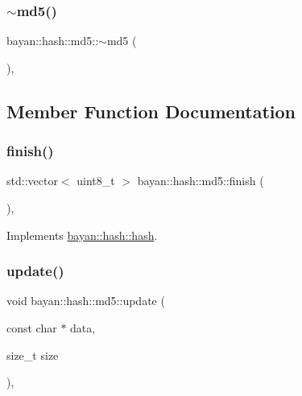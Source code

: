 \mbox{\label{classbayan_1_1hash_1_1md5_a76f7a0803576bd2746bca20a985407c4}} 
\subsubsection{\texorpdfstring{$\sim$md5()}{~md5()}}
{\footnotesize\ttfamily bayan\+::hash\+::md5\+::$\sim$md5 (\begin{DoxyParamCaption}{ }\end{DoxyParamCaption})\hspace{0.3cm}{\ttfamily [override]}, {\ttfamily [default]}}



\subsection{Member Function Documentation}
\mbox{\label{classbayan_1_1hash_1_1md5_ade79012c138da38c8b08555dd48f637d}} 
\subsubsection{\texorpdfstring{finish()}{finish()}}
{\footnotesize\ttfamily std\+::vector$<$ uint8\+\_\+t $>$ bayan\+::hash\+::md5\+::finish (\begin{DoxyParamCaption}{ }\end{DoxyParamCaption})\hspace{0.3cm}{\ttfamily [override]}, {\ttfamily [virtual]}}



Implements \hyperlink{classbayan_1_1hash_1_1hash_a0532214ff924522ba61fbe9a6ade4705}{bayan\+::hash\+::hash}.

\mbox{\label{classbayan_1_1hash_1_1md5_abfa472bb4db577181800004c0996236f}} 
\subsubsection{\texorpdfstring{update()}{update()}}
{\footnotesize\ttfamily void bayan\+::hash\+::md5\+::update (\begin{DoxyParamCaption}\item[{const char $\ast$}]{data,  }\item[{size\+\_\+t}]{size }\end{DoxyParamCaption})\hspace{0.3cm}{\ttfamily [override]}, {\ttfamily [virtual]}}



